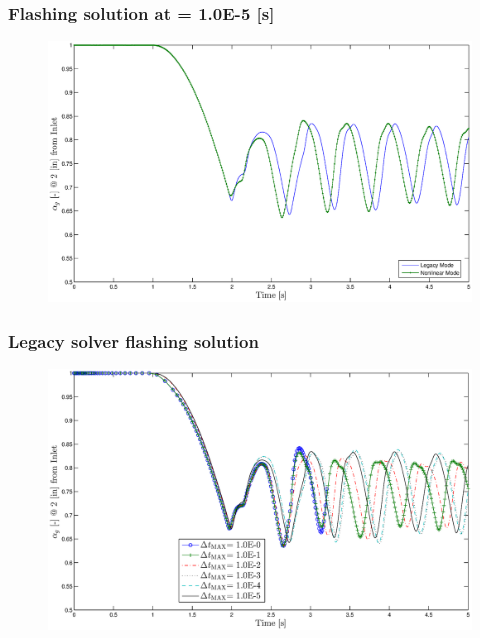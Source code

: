 \documentclass[compress,xcolor=table]{beamer}
\begin{document}
\begin{frame}
\frametitle{Flashing solution at \dtmax{} = 1.0E-5 {[s]}}

\begin{figure}[h!t]
\centering
\includegraphics[width=.94\textwidth]{images/flashing_1em5.eps}
\end{figure}

\end{frame}
\begin{frame}
\frametitle{Legacy solver flashing solution}

\begin{figure}[h!t]
\centering
\includegraphics[width=.94\textwidth]{images/cobra_flashing_al_2in.eps}
\end{figure}

\end{frame}
\end{document}
